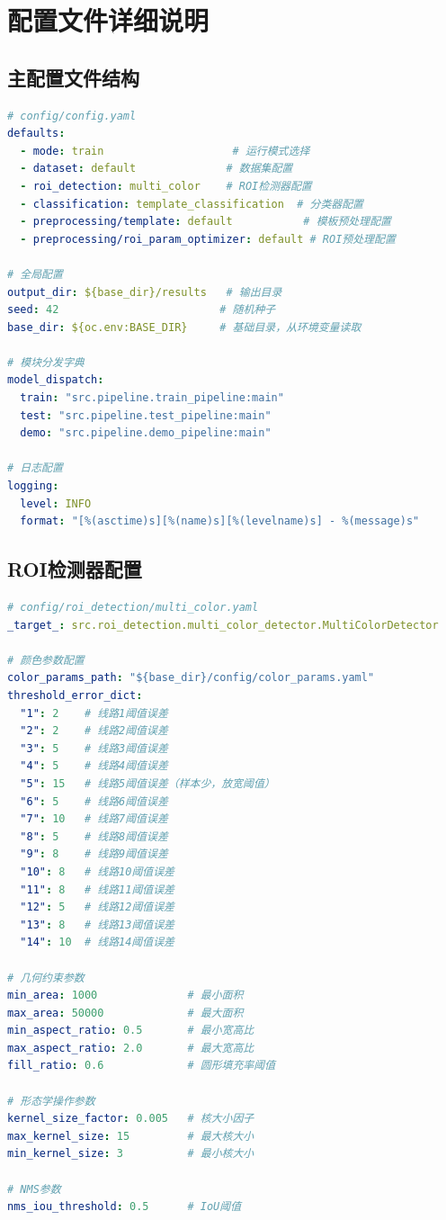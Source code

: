\documentclass[12pt,a4paper]{article}
\begin{document}
\section{配置文件详细说明}

\subsection{主配置文件结构}

\begin{lstlisting}[language=YAML]
# config/config.yaml
defaults:
  - mode: train                    # 运行模式选择
  - dataset: default              # 数据集配置
  - roi_detection: multi_color    # ROI检测器配置
  - classification: template_classification  # 分类器配置
  - preprocessing/template: default           # 模板预处理配置
  - preprocessing/roi_param_optimizer: default # ROI预处理配置

# 全局配置
output_dir: ${base_dir}/results   # 输出目录
seed: 42                         # 随机种子
base_dir: ${oc.env:BASE_DIR}     # 基础目录，从环境变量读取

# 模块分发字典
model_dispatch:
  train: "src.pipeline.train_pipeline:main"
  test: "src.pipeline.test_pipeline:main"
  demo: "src.pipeline.demo_pipeline:main"

# 日志配置
logging:
  level: INFO
  format: "[%(asctime)s][%(name)s][%(levelname)s] - %(message)s"
\end{lstlisting}

\subsection{ROI检测器配置}

\begin{lstlisting}[language=YAML]
# config/roi_detection/multi_color.yaml
_target_: src.roi_detection.multi_color_detector.MultiColorDetector

# 颜色参数配置
color_params_path: "${base_dir}/config/color_params.yaml"
threshold_error_dict:
  "1": 2    # 线路1阈值误差
  "2": 2    # 线路2阈值误差
  "3": 5    # 线路3阈值误差
  "4": 5    # 线路4阈值误差
  "5": 15   # 线路5阈值误差（样本少，放宽阈值）
  "6": 5    # 线路6阈值误差
  "7": 10   # 线路7阈值误差
  "8": 5    # 线路8阈值误差
  "9": 8    # 线路9阈值误差
  "10": 8   # 线路10阈值误差
  "11": 8   # 线路11阈值误差
  "12": 5   # 线路12阈值误差
  "13": 8   # 线路13阈值误差
  "14": 10  # 线路14阈值误差

# 几何约束参数
min_area: 1000              # 最小面积
max_area: 50000             # 最大面积
min_aspect_ratio: 0.5       # 最小宽高比
max_aspect_ratio: 2.0       # 最大宽高比
fill_ratio: 0.6             # 圆形填充率阈值

# 形态学操作参数
kernel_size_factor: 0.005   # 核大小因子
max_kernel_size: 15         # 最大核大小
min_kernel_size: 3          # 最小核大小

# NMS参数
nms_iou_threshold: 0.5      # IoU阈值
\end{lstlisting}
\end{document}
